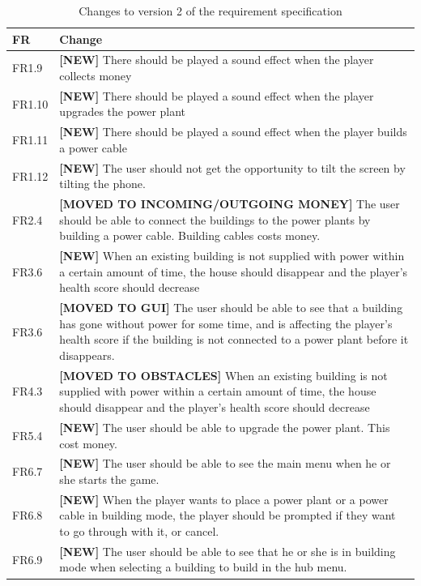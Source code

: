 	\begin{table}
	\begin{tabular}{| p{1.5cm} | p{12cm} |}
		\hline
		\rowcolor{lightgray}
		{\bf FR} & {\bf Change} \\ \hline
		FR1.9 & {\bf \color{green} [NEW]} There should be played a sound effect when 
		the player collects money \\ \hline
		FR1.10 & {\bf \color{green} [NEW]} There should be played a sound effect when 
		the player upgrades the power plant \\ \hline
		FR1.11 & {\bf \color{green} [NEW]} There should be played a sound effect when 
		the player builds a power cable \\ \hline
		FR1.12 & {\bf \color{green} [NEW]} The user should not get the opportunity to 
		tilt the screen by tilting the phone. \\ \hline
		FR2.4 & {\bf \color{orange} [MOVED TO INCOMING/OUTGOING MONEY]} The user should 
		be able to connect the buildings to the power plants by building a power cable. 
		Building cables costs money. \\ \hline
		FR3.6 & {\bf \color{green} [NEW]} When an existing building is not supplied 
		with power within a certain amount of time, the house should disappear and the player's 
		health score should decrease \\ \hline
		FR3.6 & {\bf \color{orange} [MOVED TO GUI]} The user should be able to see 
		that a building has gone without power for some time, and is affecting the 
		player's health score if the building is not connected to a power plant before it 
		disappears. \\ \hline
		FR4.3 & {\bf \color{orange} [MOVED TO OBSTACLES]} When an existing building 
		is not supplied with power within a certain amount of time, the house should 
		disappear and the player's health score should decrease \\ \hline
		FR5.4 & {\bf \color{green} [NEW]} The user should be able to upgrade the power plant. 
		This cost money. \\ \hline
		FR6.7 & {\bf \color{green} [NEW]} The user should be able to see the main 
		menu when he or she starts the game. \\ \hline
		FR6.8 & {\bf \color{green} [NEW]} When the player wants to place a power plant 
		or a power cable in building mode, the player should be prompted if they want to 
		go through with it, or cancel. \\ \hline
		FR6.9 & {\bf \color{green} [NEW]} The user should be able to see that he or she 
		is in building mode when selecting a building to build in the hub menu. \\ \hline
	\end{tabular}
	\caption{Changes to version 2 of the requirement specification}
	\end{table}
	
